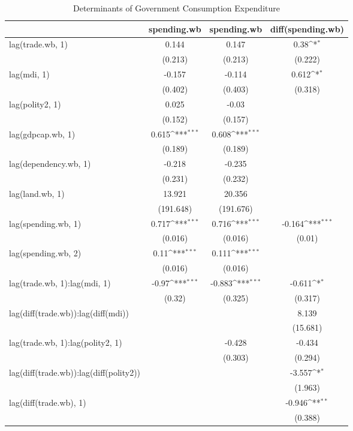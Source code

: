 \def\sym#1{\ifmmode^{#1}\else\(^{#1}\)\fi}
\begin{table}[htbp]
\caption {Determinants of Government Consumption Expenditure} \label{tab:title} 
\centering
\footnotesize
\begin{tabular}{l*{3}{c}}
\hline\hline
  &\multicolumn{1}{c}{spending.wb} &\multicolumn{1}{c}{spending.wb} &\multicolumn{1}{c}{diff(spending.wb)} \\
\hline
lag(trade.wb, 1) 		&0.144 		&0.147 		&0.38\sym{*}\\
  		&(0.213) 		&(0.213) 		&(0.222) \\
lag(mdi, 1) 		&-0.157 		&-0.114 		&0.612\sym{*} \\
  		&(0.402) 		&(0.403) 		&(0.318) \\
lag(polity2, 1) 		&0.025 		&-0.03 		& \\
  		&(0.152) 		&(0.157) 		& \\
lag(gdpcap.wb, 1) 		&0.615\sym{***} 		&0.608\sym{***} 		& \\
  		&(0.189) 		&(0.189) 		& \\
lag(dependency.wb, 1) 		&-0.218 		&-0.235 		& \\
  		&(0.231) 		&(0.232) 		& \\
lag(land.wb, 1) 		&13.921 		&20.356 		& \\
  		&(191.648) 		&(191.676) 		& \\
lag(spending.wb, 1) 		&0.717\sym{***} 		&0.716\sym{***} 		&-0.164\sym{***} \\
  		&(0.016) 		&(0.016) 		&(0.01) \\
lag(spending.wb, 2) 		&0.11\sym{***} 		&0.111\sym{***} 		& \\
  		&(0.016) 		&(0.016) 		& \\
lag(trade.wb, 1):lag(mdi, 1) 		&-0.97\sym{***} 		&-0.883\sym{***} 		&-0.611\sym{*} \\
  		&(0.32) 		&(0.325) 		&(0.317) \\
lag(diff(trade.wb)):lag(diff(mdi)) 		& 		& 		&8.139 \\
  		& 		& 		&(15.681) \\
lag(trade.wb, 1):lag(polity2, 1) 		& 		&-0.428 		&-0.434 \\
  		& 		&(0.303) 		&(0.294) \\
lag(diff(trade.wb)):lag(diff(polity2)) 		& 		& 		&-3.557\sym{*} \\
  		& 		& 		&(1.963) \\
lag(diff(trade.wb), 1) 		& 		& 		&-0.946\sym{**} \\
  		& 		& 		&(0.388) \\

\end{tabular}
\end{table}
